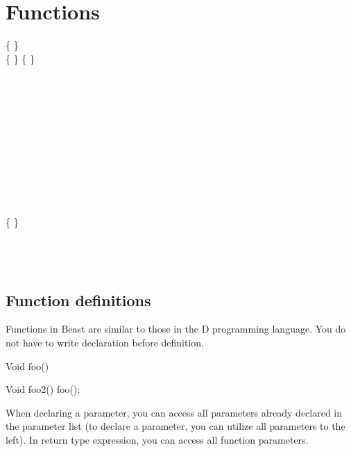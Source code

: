 \chapter{Functions}
\begin{grammar}
	 \{  \}     \\
	 \{  \} \kwd{\{} \{  \} \kwd{\}} \\
	  \\
		\grAltLn {} \\
		\grAltLn {} \\
		\grAltLn {} \\
		\grAltLn {} \\
		\grAltLn {} \\
		\grAltLn {} \\
		\grAltLn {} \\
	\\
	   \kwd{;} \\
	  \kwd{;} \\
	 \{  \}  \kwd{(}  \kwd{)}  \\
		 \\
	  \kwd{(}  \kwd{)}  \\
	   \kwd{;} \\
\end{grammar}

\section{Function definitions}
Functions in Beast are similar to those in the D programming language. You do not have to write declaration before definition.

\begin{code}
Void foo() {}

Void foo2() {
	foo();
}
\end{code}

When declaring a parameter, you can access all parameters already declared in the parameter list (to declare a parameter, you can utilize all parameters to the left). In return type expression, you can access all function parameters.

